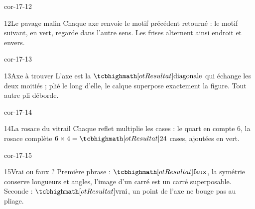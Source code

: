 \begin{blocLivre}{cor-17-12}\begin{corrige}{12}{Le pavage malin}
Chaque axe renvoie le motif précédent retourné : le motif suivant, en vert, regarde dans l’autre sens. Les frises alternent ainsi endroit et envers.
\label{fig-cor-17-12}
\end{corrige}\end{blocLivre}
\begin{blocLivre}{cor-17-13}\begin{corrige}{13}{Axe à trouver}
L’axe est la $\res{\text{diagonale}}$ qui échange les deux moitiés ; plié le long d’elle, le calque superpose exactement la figure. Tout autre pli déborde.
\label{fig-cor-17-13}
\end{corrige}\end{blocLivre}
\begin{blocLivre}{cor-17-14}\begin{corrige}{14}{La rosace du vitrail}
Chaque reflet multiplie les cases : le quart en compte 6, la rosace complète $6\times4=\res{24}$ cases, ajoutées en vert.
\label{fig-cor-17-14}
\end{corrige}\end{blocLivre}
\begin{blocLivre}{cor-17-15}\begin{corrige}{15}{Vrai ou faux ?}
Première phrase : $\res{\text{faux}}$, la symétrie conserve longueurs et angles, l’image d’un carré est un carré superposable. Seconde : $\res{\text{vrai}}$, un point de l’axe ne bouge pas au pliage.
\label{fig-cor-17-15}
\end{corrige}\end{blocLivre}
